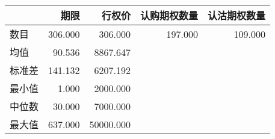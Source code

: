 \begin{tabular}{lrrrr}
\toprule
{} &      期限 &       行权价 &  认购期权数量 &  认沽期权数量 \\
\midrule
数目  & 306.000 &   306.000 & 197.000 & 109.000 \\
均值  &  90.536 &  8867.647 &         &         \\
标准差 & 141.132 &  6207.192 &         &         \\
最小值 &   1.000 &  2000.000 &         &         \\
中位数 &  30.000 &  7000.000 &         &         \\
最大值 & 637.000 & 50000.000 &         &         \\
\bottomrule
\end{tabular}
